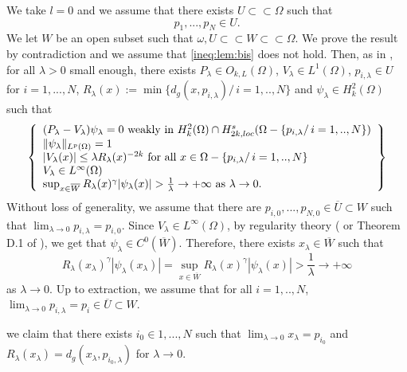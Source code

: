 \documentclass[reqno]{amsart}
\begin{document}
\medskip{} We take $l=0$ and we assume that there exists  $U\subset\subset\Omega$ such that
\begin{equation}\label{hyp:lemma:1}
p_1,...,p_N\in U.
\end{equation}
We let $W$ be an open subset such that $\omega, U\subset\subset W\subset\subset \Omega$. We prove the result by contradiction and we assume that \eqref{ineq:lem:bis} does not hold. Then, as in \cite{robert:gjms}, for all $\lambda>0$ small enough,  there exists $P_\lambda \in O_{k,L}(\Omega)$, $V_\lambda\in L^1(\Omega)$, $p_{i,\lambda}\in U$ for $i=1,...,N$,   $R_\lambda(x):=\min\{d_g(x,p_{i,\lambda})/\, i=1,..,N\}$ and  $\psi_\lambda\in H_k^2(\Omega)$  such that
\begin{equation}\label{eq:75}
\left\{\begin{array}{l}
(P_\lambda-V_\lambda)\psi_\lambda=0 \hbox{ weakly in }H_k^2(\Omega)\cap H_{2k,loc}^s(\Omega-\{p_{i,\lambda}/\, i=1,..,N\})\\
\Vert\psi_\lambda\Vert_{L^p(\Omega)}=1\\
|V_{\lambda}(x)|\leq \lambda R_\lambda(x)^{-2k}\hbox{ for all }x\in \Omega-\{p_{i,\lambda}/\, i=1,..,N\}\\
V_{\lambda}\in L^\infty(\Omega)\\
\sup_{x\in \overline{W}} R_\lambda(x)^{\gamma}|\psi_\lambda(x)|>\frac{1}{\lambda}\to +\infty\hbox{ as }\lambda\to 0.
\end{array}\right\}
\end{equation} 
Without loss of generality, we assume that there are $p_{i,0},..., p_{N,0}\in \overline{U}\subset W$ such that $\lim_{\lambda\to 0}p_{i,\lambda}=p_{i,0}$. Since $V_\lambda\in L^\infty(\Omega)$, by regularity theory (\cite{ADN} or Theorem  D.1 of \cite{robert:gjms}), we get that $\psi_\lambda\in C^0(\overline{W})$. Therefore, there exists $x_\lambda\in \overline{W}$ such that
\begin{equation}\label{lim:xlambda}
R_\lambda(x_\lambda)^{\gamma}|\psi_\lambda(x_\lambda)|=\sup_{x\in \overline{W}} R_\lambda(x)^{\gamma}|\psi_\lambda(x)|>\frac{1}{\lambda}\to +\infty
\end{equation}
as $\lambda\to 0$. Up to extraction, we assume that for all $i=1,..,N$, $\lim_{\lambda\to 0}p_{i,\lambda}=p_i\in \overline{U}\subset W$.

\medskip{} we claim that there exists $i_0\in 1,...,N$ such that $\lim_{\lambda\to 0}x_\lambda=p_{i_0}$ and $R_\lambda(x_\lambda)=d_g(x_\lambda, p_{i_0,\lambda})$ for $\lambda\to 0$. 
\end{document}
